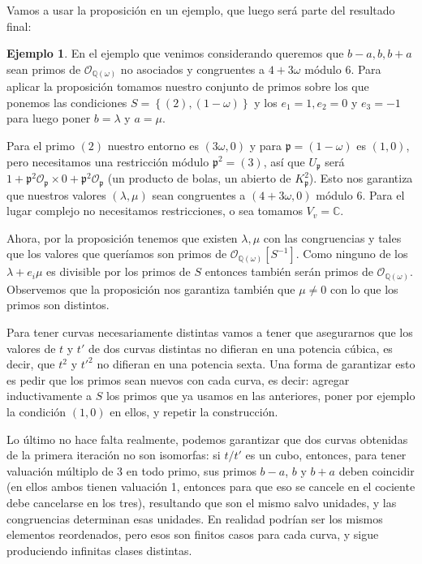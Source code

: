 \documentclass[a4paper]{book}
\theoremstyle{definition}
\newtheorem{example}[definition]{Ejemplo}
\theoremstyle{plain}
\newcommand{\CC}{\mathbb{C}}
\newcommand{\QQ}{\mathbb{Q}}
\newcommand{\OO}{\mathcal{O}}
\newcommand{\pp}{\mathfrak{p}}
\newcommand{\lla}{\left\lbrace}
\newcommand{\rla}{\right\rbrace}
\begin{document}
Vamos a usar la proposición en un ejemplo, que luego será parte del resultado final:

\begin{example}\label{ej:kaiMiCaso}
En el ejemplo que venimos considerando queremos que $b-a,b,b+a$ sean primos de $\OO_{\QQ(\omega)}$ no asociados y congruentes a $4+3\omega$ módulo $6$. Para aplicar la proposición tomamos nuestro conjunto de primos sobre los que ponemos las condiciones $S=\lla(2),(1-\omega)\rla$ y los $e_1=1, e_2=0$ y $e_3=-1$ para luego poner $b=\lambda$ y $a=\mu$.

Para el primo $(2)$ nuestro entorno es $(3\omega,0)$ y para $\pp=(1-\omega)$ es $(1,0)$, pero necesitamos una restricción módulo $\pp^2=(3)$, así que $U_{\pp}$ será $1+{\pp}^2 \OO_{\pp} \times 0+{\pp}^2 \OO_{\pp}$ (un producto de bolas, un abierto de $K_{\pp}^2$). Esto nos garantiza que nuestros valores $(\lambda,\mu)$ sean congruentes a $(4+3\omega, 0)$ módulo 6. Para el lugar complejo no necesitamos restricciones, o sea tomamos $V_v=\CC$.

Ahora, por la proposición tenemos que existen $\lambda, \mu$ con las congruencias y tales que los valores que queríamos son primos de $\OO_{\QQ(\omega)}[S^{-1}]$. Como ninguno de los $\lambda + e_i\mu$ es divisible por los primos de $S$ entonces también serán primos de $\OO_{\QQ(\omega)}$. Observemos que la proposición nos garantiza también que $\mu\neq 0$ con lo que los primos son distintos.

Para tener curvas necesariamente distintas vamos a tener que asegurarnos que los valores de $t$ y $t'$ de dos curvas distintas no difieran en una potencia cúbica, es decir, que $t^2$ y ${t'}^2$ no difieran en una potencia sexta. Una forma de garantizar esto es pedir que los primos sean nuevos con cada curva, es decir: agregar inductivamente a $S$ los primos que ya usamos en las anteriores, poner por ejemplo la condición $(1,0)$ en ellos, y repetir la construcción.
\end{example}

Lo último no hace falta realmente, podemos garantizar que dos curvas obtenidas de la primera iteración no son isomorfas: si $t/t'$ es un cubo, entonces, para tener valuación múltiplo de 3 en todo primo, sus primos $b-a$, $b$ y $b+a$ deben coincidir (en ellos ambos tienen valuación 1, entonces para que eso se cancele en el cociente debe cancelarse en los tres), resultando que son el mismo salvo unidades, y las congruencias determinan esas unidades. En realidad podrían ser los mismos elementos reordenados, pero esos son finitos casos para cada curva, y sigue produciendo infinitas clases distintas.
\end{document}
